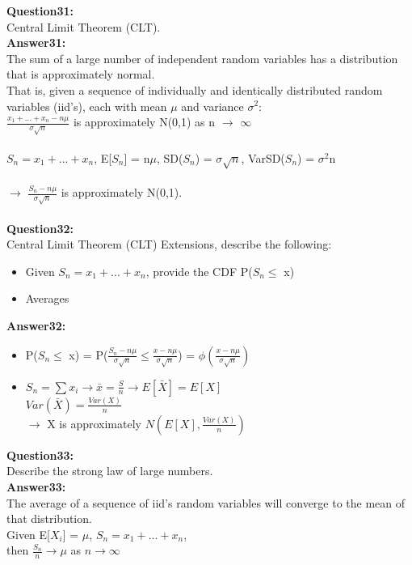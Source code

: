 \documentclass{article}
\begin{document}
\textbf{Question31:} \\
Central Limit Theorem (CLT).
\\
\textbf{Answer31:} \\
The sum of a large number of independent random variables has a distribution that is approximately normal.\\
That is, given a sequence of individually and identically distributed random variables (iid's), each with mean $\mu$ and variance $\sigma^2$:\\
$\frac{x_1 + ... + x_n - n\mu}{\sigma \sqrt{n}}$ is approximately N(0,1) as n $\rightarrow$ $\infty$
\\\\
$S_n = x_1 + ... + x_n$, E[$S_n$] = n$\mu$, SD($S_n$) = $\sigma \sqrt{n}$, VarSD($S_n$) = $\sigma^2$n
\\\\
$\rightarrow$ $\frac{S_n - n\mu}{\sigma \sqrt{n}}$ is approximately N(0,1).
\\\\


\textbf{Question32:} \\
Central Limit Theorem (CLT) Extensions, describe the following:
\begin{itemize}
	\item Given $S_n = x_1 + ... + x_n$, provide the CDF P($S_n \leq$ x)
	\item Averages
\end{itemize}

\textbf{Answer32:}\\
\begin{itemize}
	\item P($S_n \leq$ x) = P($\frac{S_n - n\mu}{\sigma \sqrt{n}} \leq \frac{x - n\mu}{\sigma \sqrt{n}}$) = $\phi(\frac{x - n\mu}{\sigma \sqrt{n}})$
	\item $S_n = \sum x_i \rightarrow \bar{x} = \frac{S}{n} \rightarrow E[\bar{X}] = E[X]$\\
	$Var(\bar{X}) = \frac{Var(X)}{n}$\\
	$\rightarrow$ X is approximately $N(E[X], \frac{Var(X)}{n})$
\end{itemize}


\textbf{Question33:} \\
Describe the strong law of large numbers.
\\
\textbf{Answer33:}\\
The average of a sequence of iid's random variables will converge to the mean of that distribution.\\
Given E[$X_i$] = $\mu$, $S_n = x_1 + ... + x_n$, \\
then $\frac{S_n}{n} \rightarrow \mu$ as $n \rightarrow \infty$
\\\\
\end{document}

